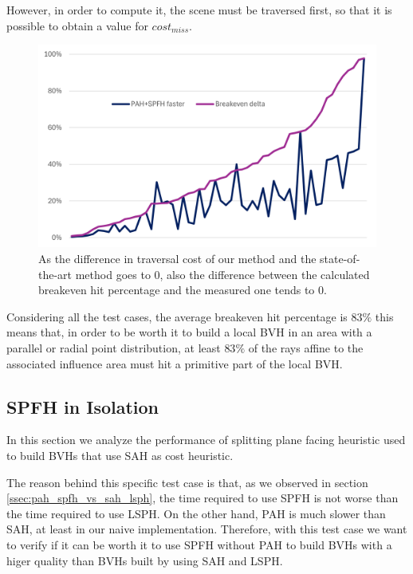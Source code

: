 \documentclass{PoliMi_MasterThesis}
\begin{document}
However, in order to compute it, the scene must be traversed first, so that it is possible to obtain a value for $cost_{miss}$.

\begin{figure}[H] 
	\includegraphics[width=\textwidth]{Images/breakeven_hit_perc_accuracy.png}
	\caption{As the difference in traversal cost of our method and the state-of-the-art method goes to 0, also the difference between the calculated breakeven hit percentage and the measured one tends to 0.}
	\label{fig:breakeven_hit_perc_accuracy}
\end{figure}

Considering all the test cases, the average breakeven hit percentage is $83\%$ this means that, in order to be worth it to build a local BVH in an area with a parallel or radial point distribution, at least $83\%$ of the rays affine to the associated influence area must hit a primitive part of the local BVH.

\subsection{SPFH in Isolation} \label{ssec:spfh_in_isolation}
In this section we analyze the performance of splitting plane facing heuristic used to build BVHs that use SAH as cost heuristic.

The reason behind this specific test case is that, as we observed in section \ref{ssec:pah_spfh_vs_sah_lsph}, the time required to use SPFH is not worse than the time required to use LSPH. On the other hand, PAH is much slower than SAH, at least in our naive implementation. Therefore, with this test case we want to verify if it can be worth it to use SPFH without PAH to build BVHs with a higer quality than BVHs built by using SAH and LSPH.
\end{document}
